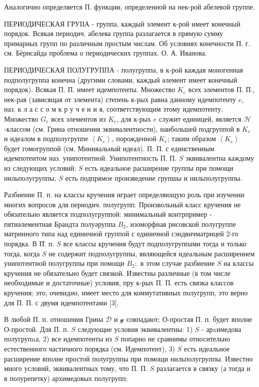 \documentclass[10pt]{article}
\begin{document}
Аналогично определяется П. функции, определенной на нек-рой абелевой группе.

ПЕРИОДИЧЕСКАЯ ГРУІІА - группа, каждый элемент к-рой имеет конечный порядок. Всякая периодич. абелева группа разлагается в прямую сумму примарных групп по различным простым числам. Об условиях конечности П. г. см. Бёрнсайда проблема о периодических группах. О. А. Иванова.

ПЕРИОДИЧЕСКАЯ ПОЛУГРУППА - полугруппа, в к-рой каждая моногенная подполугруппа конечна (другими словами, каждый әлемент имеет конечный порядок). Всякая П. П. имеет идемпотенты. Множество $K_{e}$ всех элементов П. П., нек-рая (зависящая от элемента) степень к-рых равна данному идемпотенту $e$, наз. к л а с с о м к р у ч е н и я, соответствующим этому идемпотенту. Множество $G_{e}$ всех элементов из $K_{e}$, для к-рых $e$ служит единицей, является $\mathscr{H}$-классом (см. Грина отношения эквивалентности), наибольшей подгруппой в $K_{e}$ и идеалом в подполугруппе $\left\langle K_{e}\right\rangle$, порожденной $K_{e}$; таким образом $\left\langle K_{e}\right\rangle$ будет гомогруппой (см. Минияальный идеал). П. П. с единственным идемпотентом наз. унипотентной. Унипотентность П. П. $S$ эквивалентна каждому из следующих условий: $S$ есть идеальное расширение группы при помощи нильполугруппы, $S$ есть подпрямое произведение групшы и нильполугруппы.

Разбиение П. п. на классы кручения играет определяющую роль при изучении многих вопросов для периодич. полугрупп. Произвольный класс кручения не обязательно является подполугруппой: минимальный контрпример - пятиәлементная Брандта полуәруппа $B_{2}$, изоморфная рисовской полугруппе матринного типа над единичной группой с единичной сэндвичматрицей 2-го порядка. В П̈. п. $S$ все классы кручения будут подполугруппами тогда и только тогда, когда $S$ не содержит подполугруппы, являющейся идеальным расширением унипотентной полугруппы при помощи $B_{2} ;$ в этом случае разбиение $S$ на классы кручения не обязательно будет связкой. Известны различные (в том числе необходимые и достаточные) условия, пру к-рых П. П. есть связка классов кручения; это, очевидно, имеет место для коммутативных полугрупп, это верно для П. П. с двумя идемпотентами [3].

В любой П. п. отношения Грина $\mathscr{D}$ и $\mathcal{y}$ совпадают; О-простая П. п. будет вполне О-простой. Для П. п. $S$ следующие условия эквивалентны: 1) $S$ - арxимедова полугрупnа, 2) все идемпотенты из $S$ попарно не сравнимы относительно естественного частичного порядка (см. Идемпотент), 3) $S$ есть идеальное расширение вполне простой полугруппы при помощи нильполугруппы. Известно много условий, эквивалентных тому, что П. П. $S$ разлагается в связку (а тогда и в полурепетку) архимедовых полугрупп;
\end{document}
